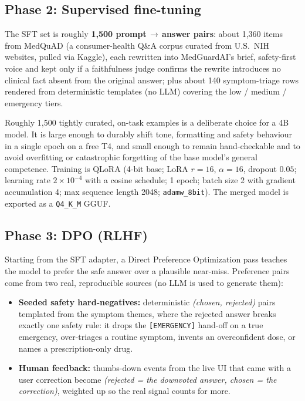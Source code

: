 \documentclass[11pt,a4paper]{article}
\begin{document}
\subsection{Phase 2: Supervised fine-tuning}
The SFT set is roughly \textbf{1{,}500 prompt\,$\rightarrow$\,answer pairs}: about 1{,}360 items from
MedQuAD (a consumer-health Q\&A corpus curated from U.S.\ NIH websites, pulled via Kaggle), each
rewritten into MedGuardAI's brief, safety-first voice and kept only if a faithfulness judge confirms
the rewrite introduces no clinical fact absent from the original answer; plus about 140 symptom-triage
rows rendered from deterministic templates (no LLM) covering the low / medium / emergency tiers.

Roughly 1{,}500 tightly curated, on-task examples is a deliberate choice for a 4B model. It is large
enough to durably shift tone, formatting and safety behaviour in a single epoch on a free T4, and
small enough to remain hand-checkable and to avoid overfitting or catastrophic forgetting of the base
model's general competence. Training is QLoRA (4-bit base; LoRA $r=16$, $\alpha=16$, dropout $0.05$;
learning rate $2\times10^{-4}$ with a cosine schedule; 1 epoch; batch size 2 with gradient
accumulation 4; max sequence length 2048; \texttt{adamw\_8bit}). The merged model is exported as a
\texttt{Q4\_K\_M} GGUF.

\subsection{Phase 3: DPO (RLHF)}
Starting from the SFT adapter, a Direct Preference Optimization pass teaches the model to prefer the
safe answer over a plausible near-miss. Preference pairs come from two real, reproducible sources (no LLM is used to generate them):

\begin{itemize}[leftmargin=1.4em,itemsep=2pt,topsep=3pt]
  \item \textbf{Seeded safety hard-negatives:} deterministic \emph{(chosen, rejected)} pairs templated
        from the symptom themes, where the rejected answer breaks exactly one safety rule:
        it drops the \texttt{[EMERGENCY]} hand-off on a true emergency, over-triages a routine symptom,
        invents an overconfident dose, or names a prescription-only drug.
  \item \textbf{Human feedback:} thumbs-down events from the live UI that came with a user correction
        become \emph{(rejected = the downvoted answer, chosen = the correction)}, weighted up so the
        real signal counts for more.
\end{itemize}
\end{document}
